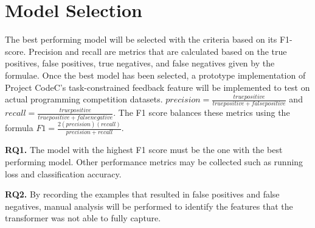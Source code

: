 \section{Model Selection}

The best performing model will be selected with the criteria based on its F1-score.
Precision and recall are metrics that are calculated based on the true positives, 
false positives, true negatives, and false negatives given by the formulae. 
Once the best model has been selected, a prototype implementation of Project 
CodeC’s task-constrained feedback feature will be implemented to test on 
actual programming competition datasets. \( precision = \frac{true positive}{true positive + false positive}\) and 
\( recall = \frac{true positive}{true positive + false negative}\). The F1 score balances these metrics using the formula 
\( F1 = \frac{2(precision)(recall)}{precision + recall}\).\newline

\textbf{RQ1.} The model with the highest F1 score must be the one with the best performing model. 
Other performance metrics may be collected such as running loss and classification accuracy.

\textbf{RQ2.} By recording the examples that resulted in false positives and false negatives, manual analysis will 
be performed to identify the features that the transformer was not able to fully capture.



